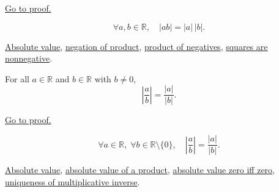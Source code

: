 \begin{remark*}[Proof]
\hyperref[prf:absolute-value-product]{Go to proof.}
\end{remark*}

\begin{remark*}
\[
  \forall a, b \in \mathbb{R},\quad
  \lvert ab \rvert = \lvert a \rvert\,\lvert b \rvert.
\]
\end{remark*}

\begin{dependencies}
\hyperref[def:absolute-value]{Absolute value},
\hyperref[thm:ring-negation-of-product]{negation of product},
\hyperref[thm:ring-product-of-negatives]{product of negatives},
\hyperref[prop:product-of-positives-is-positive-q]{squares are nonnegative}.
\end{dependencies}


\begin{theorem}
\label{thm:absolute-value-quotient}
For all $a \in \mathbb{R}$ and $b \in \mathbb{R}$ with $b \ne 0$,
\[
  \left\lvert \frac{a}{b} \right\rvert
  = \frac{\lvert a \rvert}{\lvert b \rvert}.
\]
\end{theorem}



\begin{remark*}[Proof]
\hyperref[prf:absolute-value-quotient]{Go to proof.}
\end{remark*}

\begin{remark*}
\[
  \forall a \in \mathbb{R},\;
  \forall b \in \mathbb{R} \setminus \{0\},\quad
  \left\lvert \frac{a}{b} \right\rvert
  = \frac{\lvert a \rvert}{\lvert b \rvert}.
\]
\end{remark*}

\begin{dependencies}
\hyperref[def:absolute-value]{Absolute value},
\hyperref[thm:absolute-value-product]{absolute value of a product},
\hyperref[thm:absolute-value-zero-iff-zero]{absolute value zero iff zero},
\hyperref[cor:uniqueness-multiplicative-inverse-on-q]{uniqueness of
multiplicative inverse}.
\end{dependencies}


